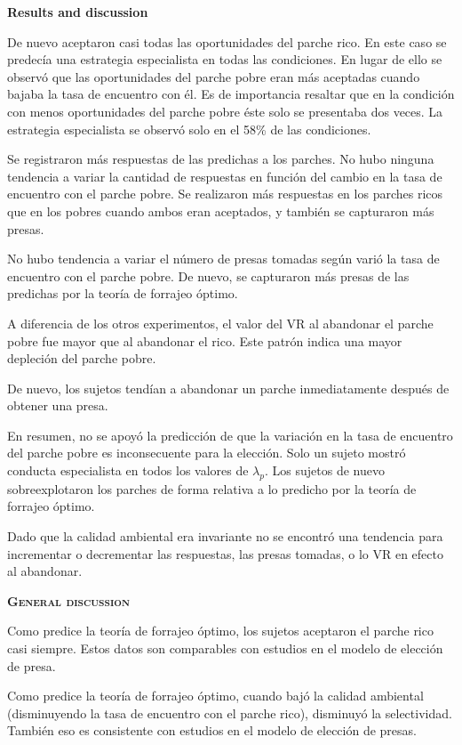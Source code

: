 \documentclass[a4paper,12pt]{article}
\begin{document}
{\bfseries Results and discussion}

De nuevo aceptaron casi todas las oportunidades del parche rico. En este caso se predecía una estrategia especialista en todas las condiciones. En lugar de ello se observó que las oportunidades del parche pobre eran más aceptadas cuando bajaba la tasa de encuentro con él. Es de importancia resaltar que en la condición con menos oportunidades del parche pobre éste solo se presentaba dos veces. La estrategia especialista se observó solo en el 58\% de las condiciones. 

Se registraron más respuestas de las predichas a los parches. No hubo ninguna tendencia a variar la cantidad de respuestas en función del cambio en la tasa de encuentro con el parche pobre. Se realizaron más respuestas en los parches ricos que en los pobres cuando ambos eran aceptados, y también se capturaron más presas.

No hubo tendencia a variar el número de presas tomadas según varió la tasa de encuentro con el parche pobre. De nuevo, se capturaron más presas de las predichas por la teoría de forrajeo óptimo. 

A diferencia de los otros experimentos, el valor del VR al abandonar el parche pobre fue mayor que al abandonar el rico. Este patrón indica una mayor depleción del parche pobre.

De nuevo, los sujetos tendían a abandonar un parche inmediatamente después de obtener una presa.

En resumen, no se apoyó la predicción de que la variación en la tasa de encuentro del parche pobre es inconsecuente para la elección. Solo un sujeto mostró conducta especialista en todos los valores de $\lambda_{p}$. Los sujetos de nuevo sobreexplotaron los parches de forma relativa a lo predicho por la teoría de forrajeo óptimo.

Dado que la calidad ambiental era invariante no se encontró una tendencia para incrementar o decrementar las respuestas, las presas tomadas, o lo VR en efecto al abandonar.

{\scshape\bfseries General discussion}

Como predice la teoría de forrajeo óptimo, los sujetos aceptaron el parche rico casi siempre. Estos datos son comparables con estudios en el modelo de elección de presa.

Como predice la teoría de forrajeo óptimo, cuando bajó la calidad ambiental (disminuyendo la tasa de encuentro con el parche rico), disminuyó la selectividad. También eso es consistente con estudios en el modelo de elección de presas.
\end{document}
